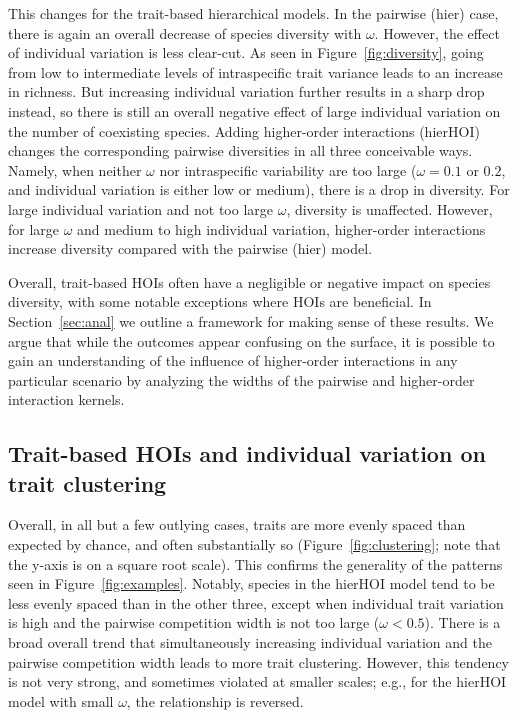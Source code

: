 \documentclass[11pt]{article}
\begin{document}
This changes for the trait-based hierarchical models. In the pairwise (hier) case, there is again an overall decrease of species diversity with $\omega$. However, the effect of individual variation is less clear-cut. As seen in Figure~\ref{fig:diversity}, going from low to intermediate levels of intraspecific trait variance leads to an increase in richness. But increasing individual variation further results in a sharp drop instead, so there is still an overall negative effect of large individual variation on the number of coexisting species. Adding higher-order interactions (hierHOI) changes the corresponding pairwise diversities in all three conceivable ways. Namely, when neither $\omega$ nor intraspecific variability are too large ($\omega = 0.1$ or $0.2$, and individual variation is either low or medium), there is a drop in diversity. For large individual variation and not too large $\omega$, diversity is unaffected. However, for large $\omega$ and medium to high individual variation, higher-order interactions increase diversity compared with the pairwise (hier) model.

Overall, trait-based HOIs often have a negligible or negative impact on species diversity, with some notable exceptions where HOIs are beneficial. In Section~\ref{sec:anal} we outline a framework for making sense of these results. We argue that while the outcomes appear confusing on the surface, it is possible to gain an understanding of the influence of higher-order interactions in any particular scenario by analyzing the widths of the pairwise and higher-order interaction kernels.


\subsection{Trait-based HOIs and individual variation on trait clustering} \label{sec:cluster-results}

Overall, in all but a few outlying cases, traits are more evenly spaced than expected by chance, and often substantially so (Figure~\ref{fig:clustering}; note that the y-axis is on a square root scale). This confirms the generality of the patterns seen in Figure~\ref{fig:examples}. Notably, species in the hierHOI model tend to be less evenly spaced than in the other three, except when individual trait variation is high and the pairwise competition width is not too large ($\omega < 0.5$). There is a broad overall trend that simultaneously increasing individual variation and the pairwise competition width leads to more trait clustering. However, this tendency is not very strong, and sometimes violated at smaller scales; e.g., for the hierHOI model with small $\omega$, the relationship is reversed.
\end{document}
